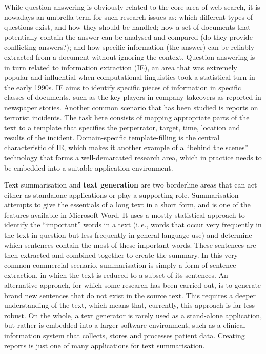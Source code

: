 \begin{multicols}{2}
While question answering is obviously related to the core area of web search, it is nowadays an umbrella term for such research issues as: which different types of questions exist, and how they should be handled; how a set of documents that potentially contain the answer can be analysed and compared (do they provide conflicting answers?); and how specific information (the answer) can be reliably extracted from a document without ignoring the context. Question answering is in turn related to information extraction (IE), an area that was extremely popular and influential when computational linguistics took a statistical turn in the early 1990s. IE aims to identify specific pieces of information in specific classes of documents, such as the key players in company takeovers as reported in newspaper stories. Another common scenario that has been studied is reports on terrorist incidents. The task here consists of mapping appropriate parts of the text to a template that specifies the perpetrator, target, time, location and results of the incident. Domain-specific template-filling is the central characteristic of IE, which makes it another example of a “behind the scenes” technology that forms a well-demarcated research area, which in practice needs to be embedded into a suitable application environment.


Text summarisation and \textbf{text generation} are two borderline areas that can act either as standalone applications or play a supporting role. Summarisation attempts to give the essentials of a long text in a short form, and is one of the features available in Microsoft Word. It uses a mostly statistical approach to identify the “important” words in a text (i.\,e., words that occur very frequently in the text in question but less frequently in general language use) and determine which sentences contain the most of these important words. These sentences are then extracted and combined together to create the summary. In this very common commercial scenario, summarisation is simply a form of sentence extraction, in which the text is reduced to a subset of its sentences. An alternative approach, for which some research has been carried out, is to generate brand new sentences that do not exist in the source text. This requires a deeper understanding of the text, which means that, currently, this approach is far less robust. On the whole, a text generator is rarely used as a stand-alone application, but rather is embedded into a larger software environment, such as a clinical information system that collects, stores and processes patient data. Creating reports is just one of many applications for text summarisation.


\end{multicols}
